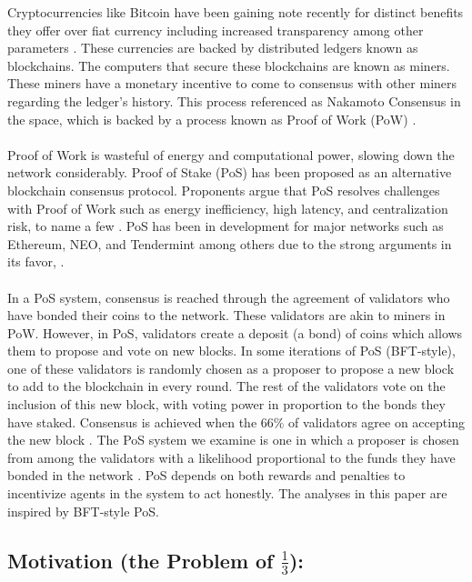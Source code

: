 \documentclass{article}
\renewcommand{\|}{\;|\;}
\begin{document}
Cryptocurrencies like Bitcoin have been gaining note recently for distinct benefits they offer over fiat currency including increased transparency among other parameters \cite{BitcoinFAQ}. These currencies are backed by distributed ledgers known as blockchains. The computers that secure these blockchains are known as miners. These miners have a monetary incentive to come to  consensus with other miners regarding the ledger's history. This process referenced as Nakamoto Consensus in the space, which is backed by a process known as Proof of Work (PoW) \cite{Bitcoin.org}.\\ \\ Proof of Work is wasteful of energy and computational power, slowing down the network considerably. Proof of Stake (PoS) has been proposed as an alternative blockchain consensus protocol. Proponents argue that PoS resolves challenges with Proof of Work such as energy inefficiency, high latency, and centralization risk, to name a few \cite{EthPoSFAQ}. PoS has been in development for major networks such as Ethereum, NEO, and Tendermint among others due to the strong arguments in its favor,  \cite{EthPoSFAQ}. \\ \\ In a PoS system, consensus is reached through the agreement of validators who have bonded their coins to the network. These validators are akin to miners in PoW. However, in PoS, validators create a deposit (a bond) of coins which allows them to propose and vote on new blocks. In some iterations of PoS (BFT-style), one of these validators is randomly chosen as a proposer to propose a new block to add to the blockchain in every round\cite{EthPoSFAQ}. The rest of the validators vote on the inclusion of this new block, with voting power in proportion to the bonds they have staked. Consensus is achieved when the 66\% of validators agree on accepting the new block . \newline \newline The PoS system we examine is one in which a proposer is chosen from among the validators with a likelihood proportional to the funds they have bonded in the network \cite{EthPoSFAQ}. PoS depends on both rewards and penalties to incentivize agents in the system to act honestly. The analyses in this paper are inspired by BFT-style PoS.

\subsection*{Motivation (the Problem of $\frac{1}{3}$):}
\end{document}
